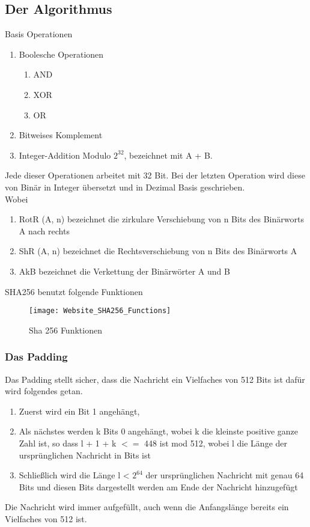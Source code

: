 {\subsection{Der Algorithmus}
\label{sec:hash_sha_alg}
Basis Operationen
\begin{enumerate}
\item Boolesche Operationen
\begin{enumerate}
\item AND
\item XOR
\item OR
\end{enumerate}
\item Bitweises Komplement
\item Integer-Addition Modulo $2^{32}$, bezeichnet mit A + B.
\end{enumerate}
Jede dieser Operationen arbeitet mit 32 Bit. Bei der letzten Operation wird diese von Binär in Integer übersetzt und in Dezimal Basis geschrieben.\\
Wobei
\begin{enumerate}
\item RotR (A, n) bezeichnet die zirkulare Verschiebung von n Bits des Binärworts A nach rechts
\item ShR (A, n) bezeichnet die Rechtsverschiebung von n Bits des Binärworts A
\item AkB bezeichnet die Verkettung der Binärwörter A und B
\end{enumerate}
SHA256 benutzt folgende Funktionen\\
\begin{figure}[H]
    \texttt{[image: Website\_SHA256\_Functions]}
    \caption{Sha 256 Funktionen}
    \label{fig:sha256func}
\end{figure}
\subsubsection{Das Padding}
\label{sec:hash_padd}
Das Padding stellt sicher, dass die Nachricht ein Vielfaches von 512 Bits ist dafür wird folgendes getan.
\begin{enumerate}
\item Zuerst wird ein Bit 1 angehängt,
\item Als nächstes werden k Bits 0 angehängt, wobei k die kleinste positive ganze Zahl ist, so dass l + 1 + k $<=$ 448 ist
mod 512, wobei l die Länge der ursprünglichen Nachricht in Bits ist
\item Schließlich wird die Länge l < $2^{64}$ der ursprünglichen Nachricht mit genau 64 Bits und diesen Bits dargestellt
werden am Ende der Nachricht hinzugefügt
\end{enumerate}
Die Nachricht wird immer aufgefüllt, auch wenn die Anfangslänge bereits ein Vielfaches von 512 ist.
}
